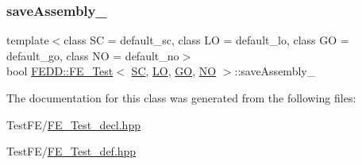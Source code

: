 \subsubsection{\texorpdfstring{save\+Assembly\+\_\+}{saveAssembly\_}}
{\footnotesize\ttfamily template$<$class SC  = default\+\_\+sc, class LO  = default\+\_\+lo, class GO  = default\+\_\+go, class NO  = default\+\_\+no$>$ \\
bool \hyperlink{classFEDD_1_1FE__Test}{F\+E\+D\+D\+::\+F\+E\+\_\+\+Test}$<$ \hyperlink{fe__test__laplace_8cpp_a79c7e86a57edbb2a5a53242bcd04e41e}{SC}, \hyperlink{fe__test__laplace_8cpp_ad6a38c9f07d3fd633eefca5bccad8410}{LO}, \hyperlink{fe__test__laplace_8cpp_afa2946b509009b4f45eb04bd8c5b27d9}{GO}, \hyperlink{fe__test__laplace_8cpp_a5e24f37b28787429872b6ecb1d0417ce}{NO} $>$\+::save\+Assembly\+\_\+}



The documentation for this class was generated from the following files\+:\begin{DoxyCompactItemize}
\item 
Test\+F\+E/\hyperlink{FE__Test__decl_8hpp}{F\+E\+\_\+\+Test\+\_\+decl.\+hpp}\item 
Test\+F\+E/\hyperlink{FE__Test__def_8hpp}{F\+E\+\_\+\+Test\+\_\+def.\+hpp}\end{DoxyCompactItemize}
